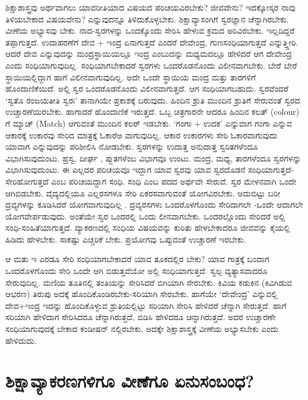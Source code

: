 ಶಿಕ್ಷಾಶಾಸ್ತ್ರವು ಅರ್ಥವಾಗಲು ಯಾವರೀತಿಯಾದ ವಿಷಯದ ಪರಿಚಯವಿರಬೇಕು? ಜೀವವೇನು? ಇದಕ್ಕೋಸ್ಕರ ನಾವು ತಿಳಿಯಬೇಕಾದ ವಿಷಯವೇನು? ಎನ್ನುವುದನ್ನೂ ತಿಳಿದುಕೊಳ್ಳಬೇಕು. ಶಿಕ್ಷಾವ್ಯಾಸಂಗಿಗೆ ಸ್ವರಜ್ಞಾನ ಚೆನ್ನಾಗಿರಬೇಕು. ವೀಣೆಯ ಅಭ್ಯಾಸವು ಬೇಕು. ನಾದ-ಸ್ವರಗಳನ್ನು ಒಂದಕ್ಕೊಂದು ಸೇರಿಸಿ ಹೇಳುವ ಕ್ರಮದ ಅರಿವಿರಬೇಕು. ಇಲ್ಲದಿದ್ದರೆ ತಪ್ಪಾಗುತ್ತದೆ. ಉದಾಹರಣೆಗೆ ದೇವ + ಇಂದ್ರ  ಏನಾಗುತ್ತದೆ ಎಂದರೆ ದೇವೇಂದ್ರ, ಗುಣಸಂಧಿಯಾಗುತ್ತದೆ ಎನ್ನುತ್ತ್ತೀರಿ. ಆದರೆ ದೇವ ಎನ್ನುವುದನ್ನು ಮಂದ್ರಸ್ಥಾಯಿಯಲ್ಲೂ ಇಂದ್ರ ಎಂಬುದನ್ನು ಮಧ್ಯಮದಲ್ಲೂ  ಹೇಳಿದರೆ ಆಗ ದೇವೇಂದ್ರ ಎಂದು ಸಂಧಿಯಾಗುವುದಿಲ್ಲ. ಸಂಧಿಯಾಗಬೇಕಾದರೆ ಸ್ವರಗಳು ಒಂದರೊಡನೊಂದು ವಿಲೀನವಾಗಬೇಕು. ಬೇರೆ ಬೇರೆ ಸ್ಥಾಯಿಯಲ್ಲಿದ್ದಾಗ ಹಾಗೆ ವಿಲೀನವಾಗುವುದಿಲ್ಲ. ಅದೇ ಒಂದೇ ಸ್ಥಾಯಿಯ ಮಂದ್ರ ಮತ್ತು ತಾರಗಳಿಗೆ ಹೊಂದಾಣಿಕೆಯಿದೆ. ಅಲ್ಲಿ ಸ್ವರ ಒಂದರೊಡನೊಂದು ವಿಲೀನವಾಗುತ್ತದೆ. ಆಗ ಸಂಧಿಯಾಗಬಹುದು. ಸ್ವರವೆಂದರೆ `ಸ್ವತೊ ರಂಜಯತೀತಿ ಸ್ವರಃ' ತಾನಾಗಿಯೇ ಪ್ರಕಾಶಕ್ಕೆ ಬರುವುದು. ಹಿಂದಿನ ಶ್ರುತಿ ಮುಂದಿನ ಶ್ರುತಿಗೆ ಸೇರುವಂತೆ ಸ್ವರದ ಉಚ್ಚಾರಣೆಯಿರಬೇಕು. ಹಾಗಾದರೆ ಹೊಂದಾಣಿಕೆ ಇರುತ್ತದೆ. ಒಬ್ಬ ಚಿತ್ರಗಾರನೇ ಆದರೂ ಹಿಂದಿನ ಕಲತ್ (colour) ಗೆ ಮ್ಯಾಚ್ (Match) ಆಗುವಂತೆ ಮುಂದಿನ ಕಲರ್ ಇಡಬೇಕು. `ಗಂಗಾ + ಉದಕ' ಎನ್ನುವಾಗ ಗಂಗಾ ಎನ್ನುವ ಆಕಾರಕ್ಕೆ  ಉಕಾರವು ಸೇರಿದ ಮಾತ್ರಕ್ಕೆ  ಓಕಾರೆಅ ವಾಗುವುದಿಲ್ಲ. ಆಕಾರ ಉಕಾರಗಳು ಸೇರಿ ಓಕಾರವಾಗುವುದು ಯಾವಾಗ ಎನ್ನುವುದನ್ನು ಪರಿಶೀಲಿಸಿ ನೋಡಬೇಕು. ಸ್ವರಗಳನ್ನು ಉದಾತ್ತ ಅನುದಾತ್ತ ಸ್ವರಿತಗಳೆಂದೂ ವಿಭಾಗಿಸುವುದುಂಟು. ಹ್ರಸ್ವ, ದೀರ್ಘ , ಪ್ಲುತಗಳೆಂಬ ವಿಭಾಗವೂ ಉಂಟು. ಮಂದ್ರ, ಮಧ್ಯ, ತಾರಗಳೆಂದೂ ಸ್ವರಗಳನ್ನು  ವಿಭಾಗಿಸುವುದುಂಟು. ಈ ಎಲ್ಲದರ ಪರಿಚಯವೂ ಇದ್ದಾಗ ಯಾವ ಸ್ವರವು ಯಾವ ಸ್ವರದೊಡನೆ ಸಂಧಿಯಾಗುತ್ತದೆ- ಸೇರಿಹೋಗುತ್ತದೆ ಎಂಬ ಪರಿಚಯದ್ದಾಗ ಸಂಧಿ. ಸಂಧಿ ಎಂಬ ಪದದ ಅರ್ಥವೇ ಸೇರುವೆ. ಸ್ವರ ಮೇಳನವಾಗಿ ಒಂದೇ ಆಗಿಬಿಡಬೇಕು. ವೈದ್ಯದಲ್ಲಿಯೂ ಎಲ್ಲರಸಗಳೂ ಸೇರಿ  ಏಕರಸವಾಗುವಂತೆ ಯೋಗವಿರಬೇಕು. ಅದುಬಿಟ್ಟು ಬರೀ ದ್ರವ್ಯಗಳನ್ನು ಕೂಡಿಸಿದರೆ ಯೋಗವಾಗುವುದಿಲ್ಲ .  ದ್ರವ್ಯರಸಗಳು ಒಂದರೊಳಗೊಂದು ಸೇರಿದಾಗಲೇ -ಒಂದೇ ಆದಾಗಲೇ ಯೋಗವೇರ್ಪಡುವುದು. ಅಂತೆಯೇ ಸ್ವರ ಒಂದರಲ್ಲಿ ಒಂದು ಲೀನವಾಗಬೇಕು. ಒಂದರಲ್ಲೊಂದು ಸೇರಿದರೆ ಅಲ್ಲಿ ಸಂಧಿ-ಸಂಹಿತೆಯಾಗುತ್ತದೆ. ವ್ಯಾಕರಣದಲ್ಲಿ ಸಂಧಿಯ ವಿಷಯವನ್ನು ಕುರಿತು ಹೇಳಬೇಕಾದರೂ ಜೀವವನ್ನು ಕೈಯಲ್ಲಿ ಹಿಡಿದು ಹೇಳಬೇಕು. ಸಾಕಷ್ಟು ಎಚ್ಚರಿಕೆ ಬೇಕು. ಪ್ರಯೋಗವು ಒಪ್ಪುವಂತೆ ಉಚ್ಚಾರಣೆ ಇರಬೇಕು.

ಆ ಮತು ಇ ಎರಡೂ ಸೇರಿ ಸಂಧಿಯಾಗಬೇಕಾದರೆ ಯಾವ ತೂಕದಲ್ಲಿರ ಬೇಕು? ಯಾವ ಗಾತ್ರಕ್ಕೆ  ಬಂದಾಗ ಒಂದರೊಳಗೊಂದು ಸೇರಿ ಒಂದೇ ಆಗಿ ಬಿಡುತ್ತವೆಯೋ ಅಲ್ಲಿ ಸಂಧಿಯಾಗುತ್ತದೆ. ಸ್ವಲ್ಪ  ವ್ಯತ್ಯಾಸವಾದರೂ ಸೇರುವುದಿಲ್ಲ. ಮಣಿಯ ತೂತಿನಲ್ಲಿ  ತಂತಿಯನ್ನು  ಸೇರಿಸಿದರೆ ಬಿಗಿಯಾಗಿ ಸೇರಬೇಕು. ಕಿವಿಯ ಕಡುಕಿನ (ಕಿವಿಗಿಡುವ ಆಭರಣ) ತಿರುಪು ಅದಕ್ಕೆ  ಹೊಂದಿಕೊಂಡಿರಬೇಕು-ಸರಿಯಾಗಿ ಸೇರಬೇಕು. ಹಾಗೆಯೇ `ದೇವೇಂದ್ರ' ಎನ್ನುವಲ್ಲಿ ದೇವ+ಇಂದ್ರ ಇದನ್ನು  ಹೊಂದಿಕೊಳ್ಳುವ ಶ್ರುತಿಯಲ್ಲಿಟ್ಟು ಸರಿಯಾಗಿ ಸೇರಿಸಿ ಹೇಳಿದರೆ ಚೆನ್ನಾಗಿ ಸೇರುತ್ತದೆ. ಹಾಗೆ ಸರಿಯಾಗಿ ಹೇಳಿದಾಗ ಸೇರಿಸಿದರೂ ಚೆನ್ನಾಗಿರುತ್ತದೆ, ಬಿಡಿಸಿ ಹೇಳಿದರೂ ಚಿನ್ನಾಗಿರುತ್ತದೆ. ಅದರ ಉಚ್ಚಾರಣೇ ಸಂಧಿಯಾಗುವುದಕ್ಕೆ ಬೇಕಾದ ಕಂಡೀಷನ್ ನಲ್ಲಿರಬೇಕು. ಅದಕ್ಕೇ ಶಿಕ್ಷಾಶಾಸ್ತ್ರಕ್ಕೆ ವೀಣೆಯ ಅಭ್ಯಾಸಬೇಕು ಎಂದು ಹೇಳಿದುದು.

\section*{ಶಿಕ್ಷಾವ್ಯಾಕರಣಗಳಿಗೂ ವೀಣೆಗೂ ಏನುಸಂಬಂಧ?}

